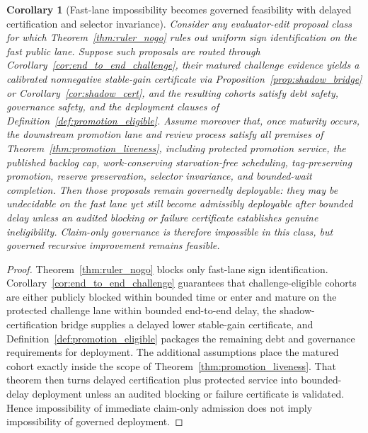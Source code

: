 \documentclass[11pt]{article}
\newtheorem{corollary}[theorem]{Corollary}
\theoremstyle{definition}
\newcommand{\1}{\mathbf{1}}
\begin{document}
\begin{corollary}[Fast-lane impossibility becomes governed feasibility with delayed certification and selector invariance]\label{cor:governed_feasibility}
Consider any evaluator-edit proposal class for which Theorem~\ref{thm:ruler_nogo} rules out uniform sign identification on the fast public lane. Suppose such proposals are routed through Corollary~\ref{cor:end_to_end_challenge}, their matured challenge evidence yields a calibrated nonnegative stable-gain certificate via Proposition~\ref{prop:shadow_bridge} or Corollary~\ref{cor:shadow_cert}, and the resulting cohorts satisfy debt safety, governance safety, and the deployment clauses of Definition~\ref{def:promotion_eligible}. Assume moreover that, once maturity occurs, the downstream promotion lane and review process satisfy all premises of Theorem~\ref{thm:promotion_liveness}, including protected promotion service, the published backlog cap, work-conserving starvation-free scheduling, tag-preserving promotion, reserve preservation, selector invariance, and bounded-wait completion. Then those proposals remain \emph{governedly deployable}: they may be undecidable on the fast lane yet still become admissibly deployable after bounded delay unless an audited blocking or failure certificate establishes genuine ineligibility. Claim-only governance is therefore impossible in this class, but governed recursive improvement remains feasible.
\end{corollary}

\begin{proof}
Theorem~\ref{thm:ruler_nogo} blocks only fast-lane sign identification. Corollary~\ref{cor:end_to_end_challenge} guarantees that challenge-eligible cohorts are either publicly blocked within bounded time or enter and mature on the protected challenge lane within bounded end-to-end delay, the shadow-certification bridge supplies a delayed lower stable-gain certificate, and Definition~\ref{def:promotion_eligible} packages the remaining debt and governance requirements for deployment. The additional assumptions place the matured cohort exactly inside the scope of Theorem~\ref{thm:promotion_liveness}. That theorem then turns delayed certification plus protected service into bounded-delay deployment unless an audited blocking or failure certificate is validated. Hence impossibility of immediate claim-only admission does not imply impossibility of governed deployment.
\end{proof}
\end{document}
